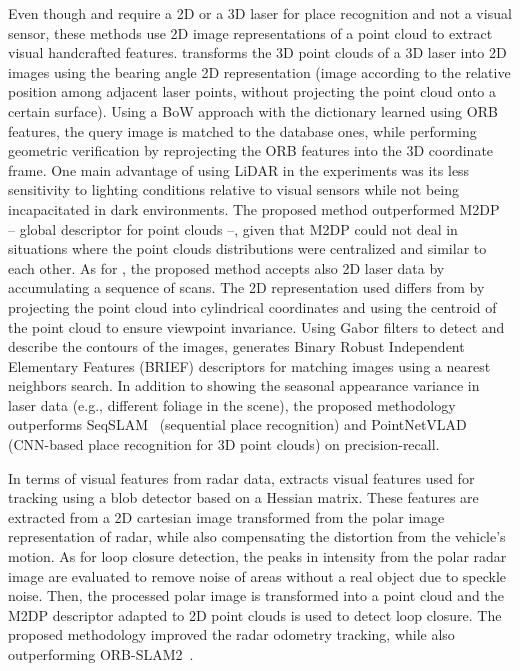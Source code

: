Even though \cite{cao-et-al:2018:2815956} and \cite{cao-et-al:2021:2962416} require a 2D or a 3D laser for place recognition and not a visual sensor, these methods use 2D image representations of a point cloud to extract visual handcrafted features.
\cite{cao-et-al:2018:2815956} transforms the 3D point clouds of a 3D laser into 2D images using the bearing angle 2D representation (image according to the relative position among adjacent laser points, without projecting the point cloud onto a certain surface). Using a BoW approach with the dictionary learned using ORB features, the query image is matched to the database ones, while performing geometric verification by reprojecting the ORB features into the 3D coordinate frame. One main advantage of using LiDAR in the experiments was its less sensitivity to lighting conditions relative to visual sensors while not being incapacitated in dark environments. The proposed method outperformed M2DP~\parencite{discussion:m2dp} -- global descriptor for point clouds --, given that M2DP could not deal in situations where the point clouds distributions were centralized and similar to each other.
As for \cite{cao-et-al:2021:2962416}, the proposed method accepts also 2D laser data by accumulating a sequence of scans. The 2D representation used differs from \cite{cao-et-al:2018:2815956} by projecting the point cloud into cylindrical coordinates and using the centroid of the point cloud to ensure viewpoint invariance.
Using Gabor filters to detect and describe the contours of the images, \cite{cao-et-al:2021:2962416} generates Binary Robust Independent Elementary Features (BRIEF) descriptors for matching images using a nearest neighbors search. In addition to showing the seasonal appearance variance in laser data (e.g., different foliage in the scene), the proposed methodology outperforms SeqSLAM~\parencite{discussion:seqslam} (sequential place recognition) and PointNetVLAD~\parencite{discussion:pointnetvlad} (CNN-based place recognition for 3D point clouds) on precision-recall.

In terms of visual features from radar data, \cite{hong-et-al:2022:02783649221080483} extracts visual features used for tracking using a blob detector based on a Hessian matrix. These features are extracted from a 2D cartesian image transformed from the polar image representation of radar, while also compensating the distortion from the vehicle's motion.
As for loop closure detection, the peaks in intensity from the polar radar image are evaluated to remove noise of areas without a real object due to speckle noise. Then, the processed polar image is transformed into a point cloud and the M2DP descriptor adapted to 2D point clouds is used to detect loop closure.
The proposed methodology improved the radar odometry tracking, while also outperforming ORB-SLAM2~\parencite{discussion:orb-slam2}.


